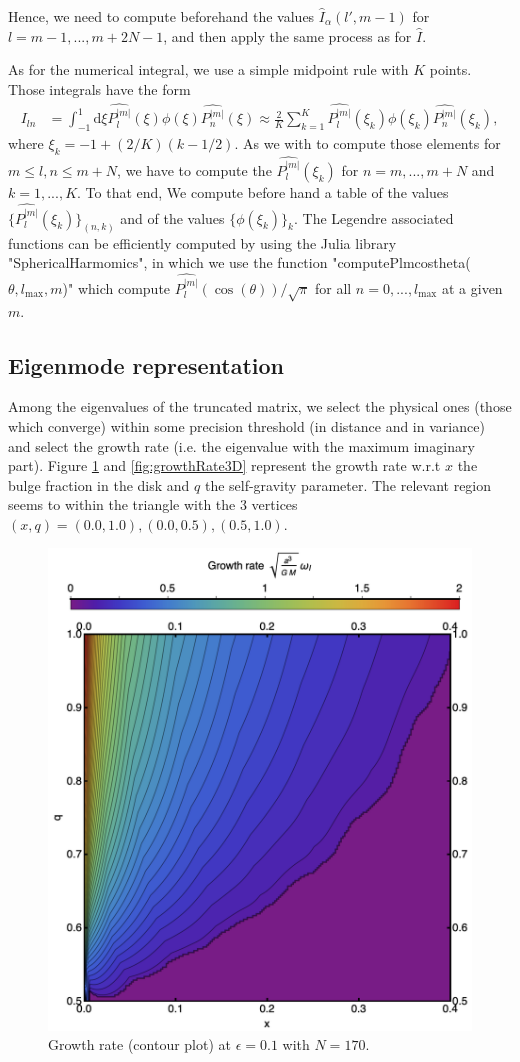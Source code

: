 \documentclass[11pt]{article}
\newcommand{\rd}{\mathrm{d}}
\newcommand{\Pnm}{P_n^{|m|}}
\newcommand{\Plm}{P_l^{|m|}}
\newcommand{\hPnm}{\widehat{\Pnm}}
\newcommand{\hPlm}{\widehat{\Plm}}
\newcommand{\hI}{\widehat{I}}
\begin{document}
Hence, we need to compute beforehand the values $\hI_{\alpha}(l',m-1)$ for $l=m-1,...,m+2N-1$, and then apply the same process as for $\hI$. 

As for the numerical integral, we use a simple midpoint rule with $K$ points. Those integrals have the form
\begin{align}
I_{ln} &= \int_{-1}^{1} \rd \xi \hPlm(\xi) \phi(\xi) \hPnm(\xi) \approx \frac{2}{K} \sum_{k=1}^{K} \hPlm(\xi_{k}) \phi(\xi_{k}) \hPnm(\xi_{k}),
\end{align}
where $\xi_{k} = -1 + (2/K)(k-1/2)$. As we with to compute those elements for $m \leq l,n \leq m+N$, we have to compute the $\hPlm(\xi_{k})$ for $n=m,...,m+N$ and $k=1,...,K$. To that end, We compute before hand a table of the values $\{\hPlm(\xi_{k})\}_{(n,k)}$ and of the values $\{\phi(\xi_{k})\}_{k}$. The Legendre associated functions can be efficiently computed by using the Julia library "SphericalHarmomics", in which we use the function "computePlmcostheta($\theta,l_{\max},m$)" which compute $\hPlm(\cos(\theta))/\sqrt{\pi}$ for all $n=0,...,l_{\max}$ at a given $m$.

\subsection{Eigenmode representation}

Among the eigenvalues of the truncated matrix, we select the physical ones (those which converge) within some precision threshold (in distance and in variance) and select the growth rate (i.e. the eigenvalue with the maximum imaginary part). Figure \ref{fig:growthRate} and \ref{fig:growthRate3D} represent the growth rate w.r.t $x$ the bulge fraction in the disk and $q$ the self-gravity parameter. The relevant region seems to within the triangle with the 3 vertices $(x,q)=(0.0,1.0), (0.0,0.5), (0.5,1.0)$.

\begin{figure}
    \centering
   \includegraphics[width=0.6 \textwidth]{figs/growthRate_eps0_1.png}
   \caption{Growth rate (contour plot) at $\epsilon=0.1$ with $N=170$.}
   \label{fig:growthRate}
\end{figure}
\end{document}

